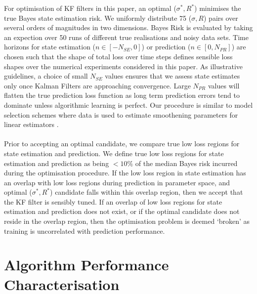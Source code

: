 For optimisation of KF filters in this paper, an optimal ($\sigma^*, R^*$) minimises the true Bayes state estimation risk. We uniformly distribute 75 ($\sigma, R$) pairs over several orders of magnitudes in two dimensions. Bayes Risk is evaluated by taking an expection over 50 runs of different true realisations and noisy data sets. Time horizons for state estimation ($n \in  [-N_{SE}, 0]$) or prediction ($n \in  [0, N_{PR}]$) are chosen such that the shape of total loss over time steps defines sensible loss shapes over the numerical experiments considered in this paper. As illustrative guidelines, a choice of small $N_{SE}$ values ensures that we assess state estimates only once Kalman Filters are approaching convergence. Large $N_{PR}$ values will flatten the true prediction loss function as long term prediction errors tend to dominate unless algorithmic learning is perfect. Our procedure is similar to model selection schemes where data is used to estimate smoothening parameters for linear estimators \cite{arlot2009data}. 
\\
\\
Prior to accepting an optimal candidate, we compare true low loss regions for state estimation and prediction. We define true low loss regions for state estimation and prediction as being $<10 \%$ of the median Bayes risk incurred during the optimisation procedure. If the low loss region in state estimation has an overlap with low loss regions during prediction in parameter space, and optimal ($\sigma^*, R^*$) candidate falls within this overlap region, then we accept that the KF filter is sensibly tuned. If an overlap of low loss regions for state estimation and prediction does not exist, or if the optimal candidate does not reside in the overlap region, then the optimisation problem is deemed `broken' as training is uncorrelated with prediction performance. 
 
\section{Algorithm Performance Characterisation \label{sec:main:Performance}}

